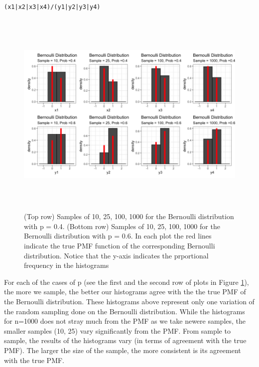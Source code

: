 \documentclass{article}\usepackage[]{graphicx}\usepackage[]{color}
\makeatletter
\newcommand{\hlopt}[1]{\textcolor[rgb]{0,0,0}{#1}}%
\newcommand{\hlstd}[1]{\textcolor[rgb]{0.345,0.345,0.345}{#1}}%
\newenvironment{kframe}{%
 \def\at@end@of@kframe{}%
 \ifinner\ifhmode%
  \def\at@end@of@kframe{\end{minipage}}%
  \begin{minipage}{\columnwidth}%
 \fi\fi%
 \def\FrameCommand##1{\hskip\@totalleftmargin \hskip-\fboxsep
 \colorbox{shadecolor}{##1}\hskip-\fboxsep
     \hskip-\linewidth \hskip-\@totalleftmargin \hskip\columnwidth}%
 \MakeFramed {\advance\hsize-\width
   \@totalleftmargin\z@ \linewidth\hsize
   \@setminipage}}%
 {\par\unskip\endMakeFramed%
 \at@end@of@kframe}
\newenvironment{knitrout}{}{} %
\makeatother
\begin{document}
\begin{enumerate}
\begin{enumerate}
\begin{knitrout}
\begin{kframe}
\begin{alltt}
\hlstd{(x1}\hlopt{|}\hlstd{x2}\hlopt{|}\hlstd{x3}\hlopt{|}\hlstd{x4)}\hlopt{/}\hlstd{(y1}\hlopt{|}\hlstd{y2}\hlopt{|}\hlstd{y3}\hlopt{|}\hlstd{y4)}
\end{alltt}
\end{kframe}
\end{knitrout}

\begin{figure}[H]
  \begin{center}
  \includegraphics[width=7in, height=4in]{figure/histograms.png}
    \caption{(Top row) Samples of 10, 25, 100, 1000 for the Bernoulli distribution with p = 0.4. (Bottom row) Samples of 10, 25, 100, 1000 for the Bernoulli distribution with p = 0.6. In each plot the red lines indicate the true PMF function of the corresponding Bernoulli distribution. Notice that the y-axis indicates the prportional frequency in the histograms}
    \label{P3fig_3} %
  \end{center}
\end{figure}
	\end{enumerate}
	For each of the cases of p (see the first and the second row of plots in Figure \ref{P3fig_3}), the more we sample, the better our histograms agree with the the true PMF of the Bernoulli distribution. These histograms above represent only one variation of the random sampling done on the Bernoulli distribution. While the histograms for n=1000 does not stray much from the PMF as we take newere samples, the smaller samples (10, 25) vary significantly from the PMF. From sample to sample, the results of the histograms vary (in terms of agreement with the true PMF). The larger the size of the sample, the more consistent is its agreement with the true PMF. 
	

\end{enumerate}
\end{document}
